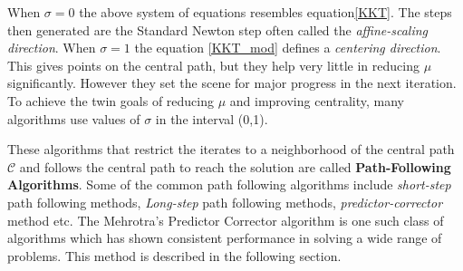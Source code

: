 \par When $\sigma=0$ the above system of equations resembles equation\ref{KKT}. The steps then generated are the Standard Newton step often called the \textit{affine-scaling direction}. When $\sigma=1$ the equation \ref{KKT_mod} defines a \textit{centering direction}. This gives points on the central path, but they help very little in reducing $\mu$ significantly. However they set the scene for major progress in the next iteration. To achieve the twin goals of reducing $\mu$ and improving centrality, many algorithms use values of $\sigma$ in the interval (0,1)\cite{wright1997primal}.
\par These algorithms that restrict the iterates to a neighborhood of the central path $\mathcal{C}$ and follows the central path to reach the solution are called \textbf{Path-Following Algorithms}. Some of the common path following algorithms include \textit{short-step} path following methods, \textit{Long-step} path following methods, \textit{predictor-corrector} method etc. The Mehrotra's Predictor Corrector algorithm \cite{mehrotra1992implementation} is one such class of algorithms which has shown consistent performance in solving a wide range of problems. This method is described in the following section.
